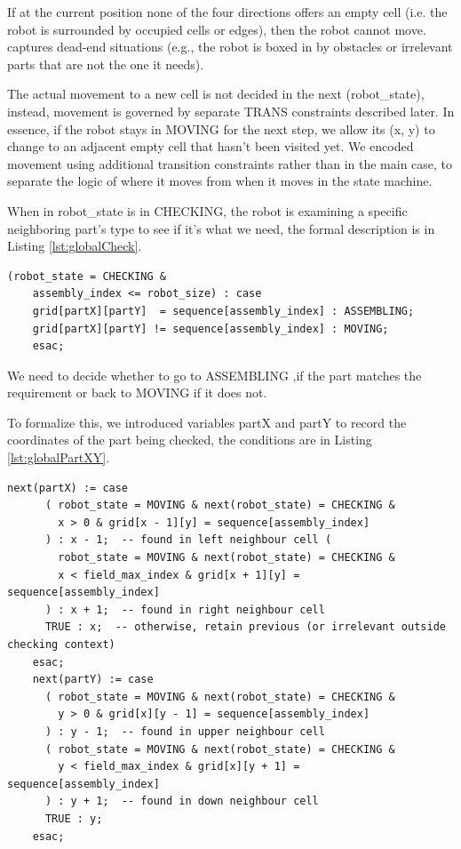 If at the current position none of the four directions offers an empty 
cell (i.e. the robot is surrounded by occupied cells or edges), then 
the robot cannot move. 
captures dead-end situations (e.g., the robot is boxed in by obstacles or 
irrelevant parts that are not the one it needs).

The actual movement to a new cell is 
not decided in the next (robot\_state), instead, movement is governed by
separate TRANS constraints described later. 
In essence, if the robot stays in MOVING for the next step, we allow 
its (x, y) to change to an adjacent empty cell that hasn’t been visited 
yet. We encoded movement using additional transition constraints rather 
than in the main case, to separate the logic of where it moves from when 
it moves in the state machine.

When in robot\_state is in CHECKING, the robot is examining a specific 
neighboring part's type to see if it's what we need, the formal description is in Listing \ref{lst:globalCheck}. 

    \begin{lstlisting}[language=NuSMV, caption={Assign for transition from CHECKING state and changing of 
        auxiliary partX and partY variables}, 
    label={lst:globalCheck}]
    (robot_state = CHECKING & 
    assembly_index <= robot_size) : case
    grid[partX][partY]  = sequence[assembly_index] : ASSEMBLING; 
    grid[partX][partY] != sequence[assembly_index] : MOVING;
    esac;
    \end{lstlisting}
We need to decide whether to go to ASSEMBLING ,if the part matches the requirement
or back to MOVING if it does not.

To formalize this, we introduced variables 
partX and partY to record the coordinates of the part being checked, the conditions are
in Listing \ref{lst:globalPartXY}. 

    \begin{lstlisting}[language=NuSMV, caption={Assign for transition from CHECKING state and changing of 
        auxiliary partX and partY variables}, 
    label={lst:globalPartXY}]
    next(partX) := case
      ( robot_state = MOVING & next(robot_state) = CHECKING & 
        x > 0 & grid[x - 1][y] = sequence[assembly_index]
      ) : x - 1;  -- found in left neighbour cell (
        robot_state = MOVING & next(robot_state) = CHECKING & 
        x < field_max_index & grid[x + 1][y] = sequence[assembly_index]
      ) : x + 1;  -- found in right neighbour cell
      TRUE : x;  -- otherwise, retain previous (or irrelevant outside checking context)
    esac;
    next(partY) := case
      ( robot_state = MOVING & next(robot_state) = CHECKING & 
        y > 0 & grid[x][y - 1] = sequence[assembly_index]
      ) : y - 1;  -- found in upper neighbour cell
      ( robot_state = MOVING & next(robot_state) = CHECKING & 
        y < field_max_index & grid[x][y + 1] = sequence[assembly_index]
      ) : y + 1;  -- found in down neighbour cell
      TRUE : y;
    esac;
    \end{lstlisting}

